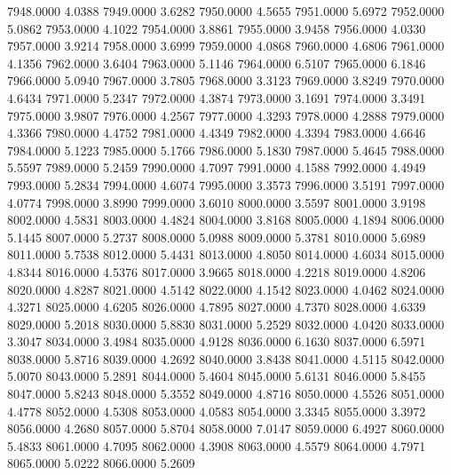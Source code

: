7948.0000      4.0388
7949.0000      3.6282
7950.0000      4.5655
7951.0000      5.6972
7952.0000      5.0862
7953.0000      4.1022
7954.0000      3.8861
7955.0000      3.9458
7956.0000      4.0330
7957.0000      3.9214
7958.0000      3.6999
7959.0000      4.0868
7960.0000      4.6806
7961.0000      4.1356
7962.0000      3.6404
7963.0000      5.1146
7964.0000      6.5107
7965.0000      6.1846
7966.0000      5.0940
7967.0000      3.7805
7968.0000      3.3123
7969.0000      3.8249
7970.0000      4.6434
7971.0000      5.2347
7972.0000      4.3874
7973.0000      3.1691
7974.0000      3.3491
7975.0000      3.9807
7976.0000      4.2567
7977.0000      4.3293
7978.0000      4.2888
7979.0000      4.3366
7980.0000      4.4752
7981.0000      4.4349
7982.0000      4.3394
7983.0000      4.6646
7984.0000      5.1223
7985.0000      5.1766
7986.0000      5.1830
7987.0000      5.4645
7988.0000      5.5597
7989.0000      5.2459
7990.0000      4.7097
7991.0000      4.1588
7992.0000      4.4949
7993.0000      5.2834
7994.0000      4.6074
7995.0000      3.3573
7996.0000      3.5191
7997.0000      4.0774
7998.0000      3.8990
7999.0000      3.6010
8000.0000      3.5597
8001.0000      3.9198
8002.0000      4.5831
8003.0000      4.4824
8004.0000      3.8168
8005.0000      4.1894
8006.0000      5.1445
8007.0000      5.2737
8008.0000      5.0988
8009.0000      5.3781
8010.0000      5.6989
8011.0000      5.7538
8012.0000      5.4431
8013.0000      4.8050
8014.0000      4.6034
8015.0000      4.8344
8016.0000      4.5376
8017.0000      3.9665
8018.0000      4.2218
8019.0000      4.8206
8020.0000      4.8287
8021.0000      4.5142
8022.0000      4.1542
8023.0000      4.0462
8024.0000      4.3271
8025.0000      4.6205
8026.0000      4.7895
8027.0000      4.7370
8028.0000      4.6339
8029.0000      5.2018
8030.0000      5.8830
8031.0000      5.2529
8032.0000      4.0420
8033.0000      3.3047
8034.0000      3.4984
8035.0000      4.9128
8036.0000      6.1630
8037.0000      6.5971
8038.0000      5.8716
8039.0000      4.2692
8040.0000      3.8438
8041.0000      4.5115
8042.0000      5.0070
8043.0000      5.2891
8044.0000      5.4604
8045.0000      5.6131
8046.0000      5.8455
8047.0000      5.8243
8048.0000      5.3552
8049.0000      4.8716
8050.0000      4.5526
8051.0000      4.4778
8052.0000      4.5308
8053.0000      4.0583
8054.0000      3.3345
8055.0000      3.3972
8056.0000      4.2680
8057.0000      5.8704
8058.0000      7.0147
8059.0000      6.4927
8060.0000      5.4833
8061.0000      4.7095
8062.0000      4.3908
8063.0000      4.5579
8064.0000      4.7971
8065.0000      5.0222
8066.0000      5.2609
